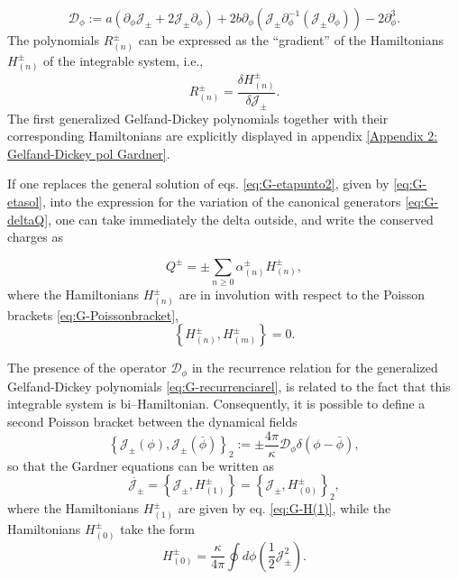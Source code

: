 \documentclass[letterpaper,11pt,oneside]{book}
\begin{document}
\begin{equation}
	\mathcal{D}_{\phi}:=a\left(\partial_{\phi}\mathcal{J_{\pm}}+2\mathcal{J_{\pm}}\partial_{\phi}\right)+2b\partial_{\phi}\left(\mathcal{J_{\pm}}\partial_{\phi}^{-1}\left(\mathcal{J_{\pm}}\partial_{\phi}\right)\right)-2\partial_{\phi}^{3}.\label{eq:G-Dcaligrafico}
\end{equation}
The polynomials $R_{\left(n\right)}^{\pm}$ can be expressed as the
``gradient'' of the Hamiltonians $H_{\left(n\right)}^{\pm}$ of
the integrable system, i.e., 
\begin{equation}
	R_{\left(n\right)}^{\pm}=\frac{\delta H_{\left(n\right)}^{\pm}}{\delta\mathcal{J_{\pm}}}.\label{eq:G-RHJ}
\end{equation}
The first generalized Gelfand-Dickey polynomials together with their
corresponding Hamiltonians are explicitly displayed in appendix \ref{Appendix 2: Gelfand-Dickey pol Gardner}.

If one replaces the general solution of eqs. \eqref{eq:G-etapunto2},
given by \eqref{eq:G-etasol}, into the expression for the variation
of the canonical generators \eqref{eq:G-deltaQ}, one can take immediately
the delta outside, and write the conserved charges as

\begin{equation}
	Q^{\pm}=\pm\sum_{n\geq0}\alpha_{\left(n\right)}^{\pm}H_{\left(n\right)}^{\pm},\label{eq:G-QHn}
\end{equation}
where the Hamiltonians $H_{\left(n\right)}^{\pm}$ are in involution
with respect to the Poisson brackets \eqref{eq:G-Poissonbracket},
\[
\left\{ H_{\left(n\right)}^{\pm},H_{\left(m\right)}^{\pm}\right\} =0.
\]

The presence of the operator $\mathcal{D}_{\phi}$ in the recurrence
relation for the generalized Gelfand-Dickey polynomials \eqref{eq:G-recurrenciarel},
is related to the fact that this integrable system is bi--Hamiltonian.
Consequently, it is possible to define a second Poisson bracket between
the dynamical fields
\begin{equation}
	\left\{ \mathcal{J_{\pm}}\left(\phi\right),\mathcal{J_{\pm}}\left(\bar{\phi}\right)\right\} _{2}:=\pm\frac{4\pi}{\kappa}\mathcal{D}_{\phi}\delta\left(\phi-\bar{\phi}\right),\label{eq:G-Poissonbracket2}
\end{equation}
so that the Gardner equations can be written as 
\[
\dot{\mathcal{J}_{\pm}}=\left\{ \mathcal{J_{\pm}},H_{\left(1\right)}^{\pm}\right\} =\left\{ \mathcal{J_{\pm}},H_{\left(0\right)}^{\pm}\right\} _{2},
\]
where the Hamiltonians $H_{\left(1\right)}^{\pm}$ are given by eq.
\eqref{eq:G-H(1)}, while the Hamiltonians $H_{\left(0\right)}^{\pm}$
take the form
\begin{equation}
	H_{(0)}^{\pm}=\frac{\kappa}{4\pi}\oint d\phi\left(\frac{1}{2}\mathcal{J}_{\pm}^{2}\right).\label{eq:G-H0}
\end{equation}
\end{document}
